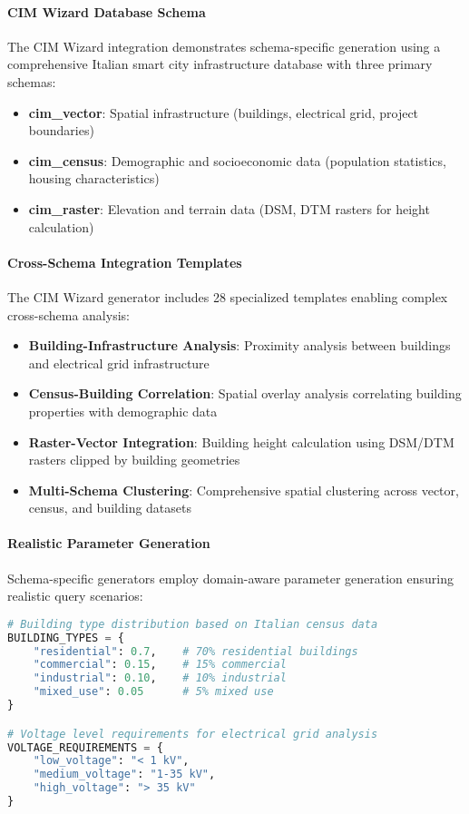 \paragraph{CIM Wizard Database Schema}
The CIM Wizard integration demonstrates schema-specific generation using a comprehensive Italian smart city infrastructure database with three primary schemas:
\begin{itemize}
    \item \textbf{cim\_vector}: Spatial infrastructure (buildings, electrical grid, project boundaries)
    \item \textbf{cim\_census}: Demographic and socioeconomic data (population statistics, housing characteristics)
    \item \textbf{cim\_raster}: Elevation and terrain data (DSM, DTM rasters for height calculation)
\end{itemize}

\paragraph{Cross-Schema Integration Templates}
The CIM Wizard generator includes 28 specialized templates enabling complex cross-schema analysis:
\begin{itemize}
    \item \textbf{Building-Infrastructure Analysis}: Proximity analysis between buildings and electrical grid infrastructure
    \item \textbf{Census-Building Correlation}: Spatial overlay analysis correlating building properties with demographic data
    \item \textbf{Raster-Vector Integration}: Building height calculation using DSM/DTM rasters clipped by building geometries
    \item \textbf{Multi-Schema Clustering}: Comprehensive spatial clustering across vector, census, and building datasets
\end{itemize}

\paragraph{Realistic Parameter Generation}
Schema-specific generators employ domain-aware parameter generation ensuring realistic query scenarios:
\begin{lstlisting}[language=python,caption={Domain-aware parameter generation example}]
# Building type distribution based on Italian census data
BUILDING_TYPES = {
    "residential": 0.7,    # 70% residential buildings
    "commercial": 0.15,    # 15% commercial
    "industrial": 0.10,    # 10% industrial
    "mixed_use": 0.05      # 5% mixed use
}

# Voltage level requirements for electrical grid analysis
VOLTAGE_REQUIREMENTS = {
    "low_voltage": "< 1 kV",
    "medium_voltage": "1-35 kV", 
    "high_voltage": "> 35 kV"
}
\end{lstlisting}

